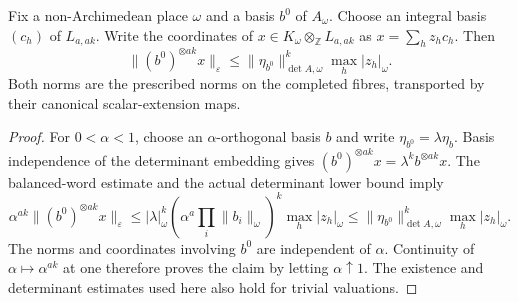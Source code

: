 \begin{lemma}
\label{lem:contraction-normalized-lattice}
\leanok
Fix a non-Archimedean place $\omega$ and a basis $b^0$ of $A_\omega$.
Choose an integral basis $(c_h)$ of $L_{a,ak}$. Write the coordinates of
$x\in K_\omega\otimes_{\mathbb Z}L_{a,ak}$ as $x=\sum_hz_hc_h$. Then
\[
 \|(b^0)^{\otimes ak}x\|_\varepsilon
 \leq\|\eta_{b^0}\|_{\det A,\omega}^{k}\max_h|z_h|_\omega.
\]
Both norms are the prescribed norms on the completed fibres, transported
by their canonical scalar-extension maps.
\end{lemma}
\begin{proof}
For $0<\alpha<1$, choose an $\alpha$-orthogonal basis $b$ and write
$\eta_{b^0}=\lambda\eta_b$. Basis independence of the determinant embedding
gives $(b^0)^{\otimes ak}x=\lambda^k b^{\otimes ak}x$.
The balanced-word estimate and the actual determinant lower bound imply
\[
 \alpha^{ak}\|(b^0)^{\otimes ak}x\|_\varepsilon
 \leq |\lambda|_\omega^k
       \left(\alpha^a\prod_i\|b_i\|_\omega\right)^k\max_h|z_h|_\omega
 \leq\|\eta_{b^0}\|_{\det A,\omega}^{k}\max_h|z_h|_\omega.
\]
The norms and coordinates involving $b^0$ are independent of $\alpha$.
Continuity of $\alpha\mapsto\alpha^{ak}$ at one therefore proves the
claim by letting $\alpha\uparrow1$. The existence and determinant estimates
used here also hold for trivial valuations.
\end{proof}

